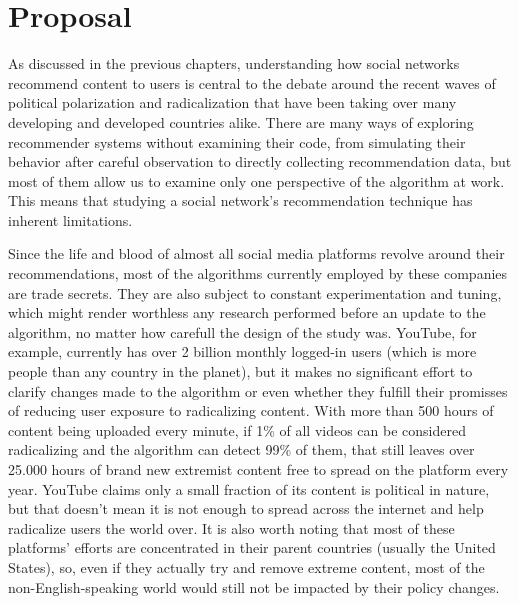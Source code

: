 





\chapter{Proposal}
\label{cap:proposal}

As discussed in the previous chapters, understanding how social networks
recommend content to users is central to the debate around the recent waves of
political polarization and radicalization that have been taking over many
developing and developed countries alike. There are many ways of exploring
recommender systems without examining their code, from simulating their behavior
after careful observation to directly collecting recommendation data, but most
of them allow us to examine only one perspective of the algorithm at work. This
means that studying a social network's recommendation technique has inherent
limitations.

Since the life and blood of almost all social media platforms revolve around
their recommendations, most of the algorithms currently employed by these
companies are trade secrets. They are also subject to constant experimentation
and tuning, which might render worthless any research performed before an update
to the algorithm, no matter how carefull the design of the study was. YouTube,
for example, currently has over 2 billion monthly logged-in users (which is more
people than any country in the planet), but it makes no significant effort to
clarify changes made to the algorithm or even whether they fulfill their
promisses of reducing user exposure to radicalizing content. With more than 500
hours of content being uploaded every minute, if 1\% of all videos can be
considered radicalizing and the algorithm can detect 99\% of them, that still
leaves over 25.000 hours of brand new extremist content free to spread on the
platform every year. YouTube claims only a small fraction of its content is
political in nature, but that doesn't mean it is not enough to spread across the
internet and help radicalize users the world over. It is also worth noting that
most of these platforms' efforts are concentrated in their parent countries
(usually the United States), so, even if they actually try and remove extreme
content, most of the non-English-speaking world would still not be impacted by
their policy changes.

